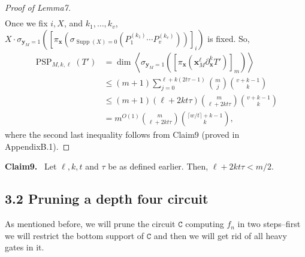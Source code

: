 \documentclass[10pt,a4paper]{article}
\newenvironment{authorclaim}[1]{\par\medskip\noindent\textbf{#1.}\ \ignorespaces}{\par\medskip}
\DeclareMathOperator{\PSP}{PSP}
\begin{document}
\begin{proof}[Proof of Lemma7]
\begin{align*}
\end{align*}
Once we fix $i,X$, and $k_1,\ldots,k_v$, $X\cdot\sigma_{\mathbf y_M=1}([\pi_{\mathbf x}(\sigma_{\operatorname{Supp}(X)=0}(P_1^{(k_1)}\cdots P_v^{(k_v)}))]_i)$ is fixed. So,
\begin{align*}
\PSP_{M,k,\ell}(T')
&=\dim\left\langle\sigma_{\mathbf y_M=1}([\pi_{\mathbf x}(\mathbf x_M^\ell\partial_{\mathbf x}^kT')]_m)\right\rangle\\
&\le(m+1)\sum_{j=0}^{\ell+k(2t\tau-1)}\binom mj\binom{v+k-1}k\\
&\le(m+1)(\ell+2kt\tau)\binom m{\ell+2kt\tau}\binom{v+k-1}k\\
&=m^{O(1)}\binom m{\ell+2kt\tau}\binom{\lceil w/t\rceil+k-1}k,
\end{align*}
where the second last inequality follows from Claim9 (proved in AppendixB.1).
\end{proof}
\begin{authorclaim}{Claim9}
Let $\ell,k,t$ and $\tau$ be as defined earlier. Then, $\ell+2kt\tau<m/2$.
\end{authorclaim}

\subsection*{3.2 Pruning a depth four circuit}
As mentioned before, we will prune the circuit $\mathtt C$ computing $f_n$ in two steps--first we will restrict the bottom support of $\mathtt C$ and then we will get rid of all heavy gates in it.
\end{document}
